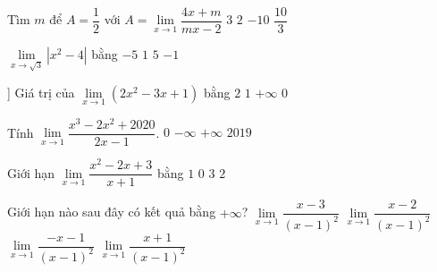 \begin{ex}%
	Tìm $m$ để $A=\dfrac{1}{2}$ với $A=\lim\limits_{x\to  1}\dfrac{4x+m}{mx-2}$
	 \choice
		{$3$} 
		 {$2$}
		{\True $-10$} 
		 {$\dfrac{10}{3}$}
\end{ex}

\begin{ex}%
	$\lim\limits_{x\to \sqrt{3}}\left|x^2-4\right|$  bằng
	 \choice
		{$-5$} 
		{\True $1$} 
		 {$5$}
		{$-1$} 
\end{ex}

\begin{ex}%
	 ]
	Giá trị của  $\lim\limits_{x\to 1}\left(2x^2-3x+1\right)$ bằng
	 \choice
		 {$2$}
		{$1$} 
		 {$+\infty$}
		{\True  $0$}
\end{ex}

\begin{ex}%
	Tính $\lim\limits_{x\to  1}\dfrac{x^3-2x^2+2020}{2x-1}$.
	\choice 
		 {$0$}
		 {$-\infty$}
		 {$+\infty$}
		{\True $2019$} 
\end{ex}

\begin{ex}%
	Giới hạn  $\lim\limits_{x\to 1}\dfrac{x^2-2 x+3}{x+1}$ bằng
	 \choice
		{\True $1$} 
		 {$0$}
		{$3$} 
		{$2$} 
\end{ex}

\begin{ex}%
	Giới hạn nào sau đây có kết quả bằng $+\infty$? 
	 \choice
		{$\lim\limits_{x\to 1}\dfrac{x-3}{(x-1)^2}$} 
		 {$\lim\limits_{x\to 1}\dfrac{x-2}{(x-1)^2}$}
		 {$\lim\limits_{x\to 1}\dfrac{-x-1}{(x-1)^2}$}
		 {\True $\lim\limits_{x\to 1}\dfrac{x+1}{(x-1)^2}$}
\end{ex}

